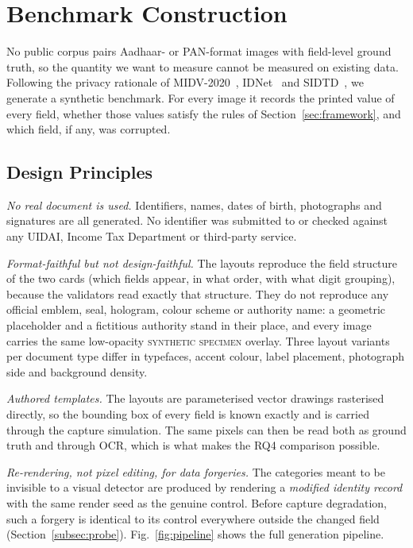 \documentclass[conference]{IEEEtran}
\begin{document}
\section{Benchmark Construction}
\label{sec:dataset}

No public corpus pairs Aadhaar- or PAN-format images with field-level
ground truth, so the quantity we want to measure cannot be measured on
existing data. Following the privacy rationale of
MIDV-2020~\cite{midv}, IDNet~\cite{idnet} and SIDTD~\cite{sidtd}, we
generate a synthetic benchmark. For every image it records the printed
value of every field, whether those values satisfy the rules of
Section~\ref{sec:framework}, and which field, if any, was corrupted.

\subsection{Design Principles}
\label{subsec:principles}

\emph{No real document is used.} Identifiers, names, dates of birth,
photographs and signatures are all generated. No identifier was
submitted to or checked against any UIDAI, Income Tax Department or
third-party service.

\emph{Format-faithful but not design-faithful.} The layouts reproduce
the field structure of the two cards (which fields appear, in what
order, with what digit grouping), because the validators read exactly
that structure. They do not reproduce any official emblem, seal, hologram, colour
scheme or authority name: a geometric placeholder and a fictitious
authority stand in their place, and every image carries the same
low-opacity \textsc{synthetic specimen} overlay. Three layout variants
per document type differ in typefaces, accent colour, label placement,
photograph side and background density.

\emph{Authored templates.} The layouts are parameterised vector
drawings rasterised directly, so the bounding box of every field is
known exactly and is carried through the capture simulation. The same
pixels can then be read both as ground truth and through OCR, which is
what makes the RQ4 comparison possible.

\emph{Re-rendering, not pixel editing, for data forgeries.} The
categories meant to be invisible to a visual detector are produced by
rendering a \emph{modified identity record} with the same render seed
as the genuine control. Before capture degradation, such a forgery is
identical to its control everywhere outside the changed field
(Section~\ref{subsec:probe}). Fig.~\ref{fig:pipeline} shows the full
generation pipeline.
\end{document}
